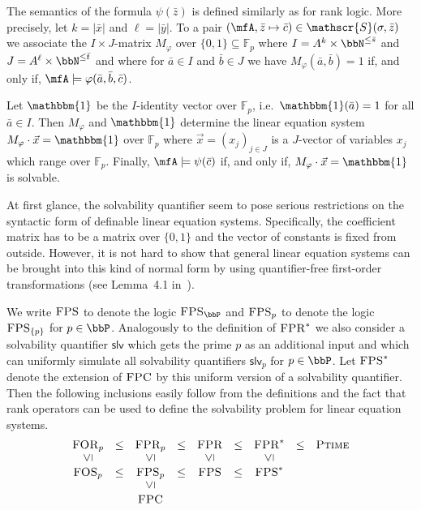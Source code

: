 \documentclass[a4paper,UKenglish]{lipics}
\newcommand{\card}[1]{\ensuremath{|#1|}}
\newcommand{\Primes}{\bbP}
\newcommand{\field}[1]{\mathbb{#1}}
\newcommand{\onevec}{\ensuremath{\mathbbm{1}}}
\newcommand{\N}{\ensuremath{\bbN}}
\newcommand{\Str}{\ensuremath{\mathscr{S}}}
\newcommand{\logic}[1]{\ensuremath{\textsc{#1}}\xspace}
\newcommand{\FPC}{\logic{FPC}}
\newcommand{\FPRK}{\logic{FPR}}
\newcommand{\FPR}{\FPRK}
\newcommand{\FOSp}{\ensuremath{\logic{FOS}_p}\xspace}
\newcommand{\FPSp}{\ensuremath{\logic{FPS}_p}\xspace}
\newcommand{\FPS}{\ensuremath{\logic{FPS}}\xspace}
\newcommand{\FPSvar}{\ensuremath{\logic{FPS}^*}\xspace}
\newcommand{\FPSx}[1]{\ensuremath{\logic{FPS}_{#1}}\xspace}
\newcommand{\FOR}{\ensuremath{\logic{FOR}}\xspace}
\newcommand{\FPRp}{\ensuremath{\logic{FPR}_p}\xspace}
\newcommand{\FPRvar}{\ensuremath{\logic{FPR}^*}\xspace}
\newcommand{\slv}{\ensuremath{\textsf{slv}}\xspace}
\newcommand{\slvp}{\ensuremath{\textsf{slv}_p}\xspace}
\newcommand{\compclass}[1]{\ensuremath{\textsc{#1}}\xspace}
\newcommand{\PTIME}{\compclass{Ptime}}
\renewcommand{\phi}{\varphi}
\newcommand{\ba}{{\bar a}}
\newcommand{\bb}{{\bar b}}
\newcommand{\bc}{{\bar c}}
\newcommand{\bx}{{\bar x}}
\newcommand{\by}{{\bar y}}
\newcommand{\bz}{{\bar z}}
\newcommand{\vct}[1]{\vec{#1}}
\theoremstyle{plain}
\begin{document}
The semantics of the formula $\psi(\bz)$ is defined similarly as for rank logic.
More precisely, let $k = \card{\bx}$ and $\ell = \card{\by}$. 
To a pair $(\mfA, \bz \mapsto \bc) \in \Str(\sigma, \bz)$ we 
associate the $I\times J$-matrix $M_\phi$ over $\{ 0, 1 \}
\subseteq \field F_p$ where $I = A^k \times \N^{\leq \bar s}$ and $J = 
A^\ell \times \N^{\leq \bar t}$ and where for $\ba \in I$ and $\bb \in J$ 
we have $M_\phi(\ba,\bb) = 1$ if, and only if, $\mfA \models 
\phi(\ba,\bb,\bc)$.

Let $\onevec$ be the $I$-identity vector over $\field F_p$, i.e.\ 
$\onevec(\ba) = 1$ for all $\ba \in I$. Then $M_\phi$ and $\onevec$ 
determine
the linear
equation system $M_\phi \cdot \vct x = \onevec$ over $\field F_p$ where 
$\vct x
= (x_j)_{j \in J}$ is a $J$-vector of variables $x_j$ which range over 
$\field
F_p$. Finally, $\mfA \models \psi(\bc)$ if, and only if, $M_\phi 
\cdot \vct x = \onevec$ is solvable.

\smallskip
At first glance, the solvability quantifier seem to pose 
serious restrictions on 
the syntactic form of definable linear equation systems.
Specifically, the coefficient matrix has to be a matrix over $\{0,1\}$ and
the vector of constants is fixed from outside.
However, it is not hard to show that general linear equation systems can 
be brought into this kind of normal form by using quantifier-free 
first-order transformations (see Lemma~4.1 in~\cite{DaGrHoKoPa13}).


We write $\FPS$ to denote the logic $\FPSx{\Primes}$ and $\FPSp$ to denote 
the logic $\FPSx{\{ p \}}$ for $p \in \bbP$. 
Analogously to the definition of $\FPRvar$ we also consider a 
solvability quantifier $\slv$ which gets the prime $p$ as an 
additional input and which can uniformly simulate all solvability 
quantifiers $\slvp$ for $p \in \bbP$. 
Let $\FPSvar$ denote the extension of $\FPC$ by this uniform version of a 
solvability quantifier.
Then the following inclusions easily follow from the definitions and the fact 
that rank operators can be used to define the solvability problem for linear 
equation systems.
\[
   \begin{array}{ccccccccc}
    \FOR_p & \leq & \FPRp & \leq & \FPR  & \leq & \FPRvar & \leq & \PTIME \\
\text{\rotatebox{90}{$\leq$}}  &  &   \text{\rotatebox{90}{$\leq$}} &  &
    \text{\rotatebox{90}{$\leq$}} & &   \text{\rotatebox{90}{$\leq$}} & & \\
\FOSp & \leq & \FPSp & \leq & \FPS  & \leq & \FPSvar & & \\
&  &   \text{\rotatebox{90}{$\leq$}} &  & & &    & & \\
&  & \FPC & &   &  &  & & \\
  \end{array}
\]
\end{document}
